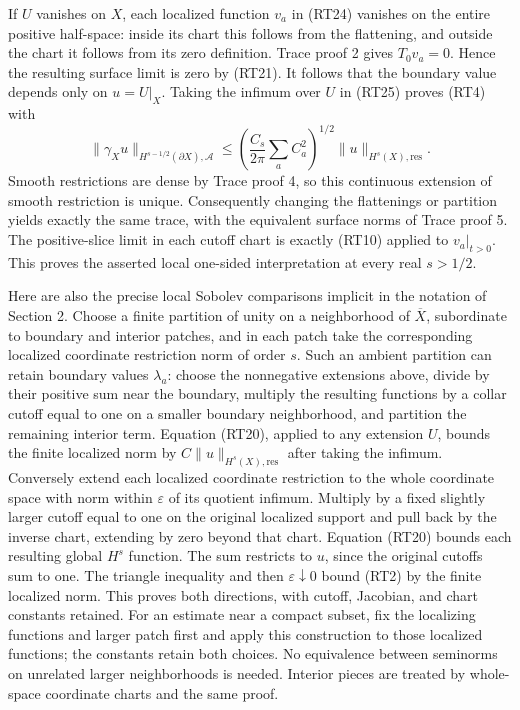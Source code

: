 \documentclass[
  11pt,
]{article}
\begin{document}
If \(U\) vanishes on \(X\), each localized function \(v_a\) in (RT24)
vanishes on the entire positive half-space: inside its chart this
follows from the flattening, and outside the chart it follows from its
zero definition. Trace proof 2 gives \(T_0v_a=0\). Hence the resulting
surface limit is zero by (RT21). It follows that the boundary value
depends only on \(u=U|_X\). Taking the infimum over \(U\) in (RT25)
proves (RT4) with \[
 \|\gamma_Xu\|_{H^{s-1/2}(\partial X),\mathcal A}
 \leq\left(\frac{C_s}{2\pi}\sum_a C_a^2\right)^{1/2}
      \|u\|_{H^s(X),\mathrm{res}}.
 \tag{RT26}
\] Smooth restrictions are dense by Trace proof 4, so this continuous
extension of smooth restriction is unique. Consequently changing the
flattenings or partition yields exactly the same trace, with the
equivalent surface norms of Trace proof 5. The positive-slice limit in
each cutoff chart is exactly (RT10) applied to \(v_a|_{t>0}\). This
proves the asserted local one-sided interpretation at every real
\(s>1/2\).

Here are also the precise local Sobolev comparisons implicit in the
notation of Section 2. Choose a finite partition of unity on a
neighborhood of \(\overline X\), subordinate to boundary and interior
patches, and in each patch take the corresponding localized coordinate
restriction norm of order \(s\). Such an ambient partition can retain
boundary values \(\lambda_a\): choose the nonnegative extensions above,
divide by their positive sum near the boundary, multiply the resulting
functions by a collar cutoff equal to one on a smaller boundary
neighborhood, and partition the remaining interior term. Equation
(RT20), applied to any extension \(U\), bounds the finite localized norm
by \(C\|u\|_{H^s(X),\mathrm{res}}\) after taking the infimum. Conversely
extend each localized coordinate restriction to the whole coordinate
space with norm within \(\varepsilon\) of its quotient infimum. Multiply
by a fixed slightly larger cutoff equal to one on the original localized
support and pull back by the inverse chart, extending by zero beyond
that chart. Equation (RT20) bounds each resulting global \(H^s\)
function. The sum restricts to \(u\), since the original cutoffs sum to
one. The triangle inequality and then \(\varepsilon\downarrow0\) bound
(RT2) by the finite localized norm. This proves both directions, with
cutoff, Jacobian, and chart constants retained. For an estimate near a
compact subset, fix the localizing functions and larger patch first and
apply this construction to those localized functions; the constants
retain both choices. No equivalence between seminorms on unrelated
larger neighborhoods is needed. Interior pieces are treated by
whole-space coordinate charts and the same proof.
\end{document}
